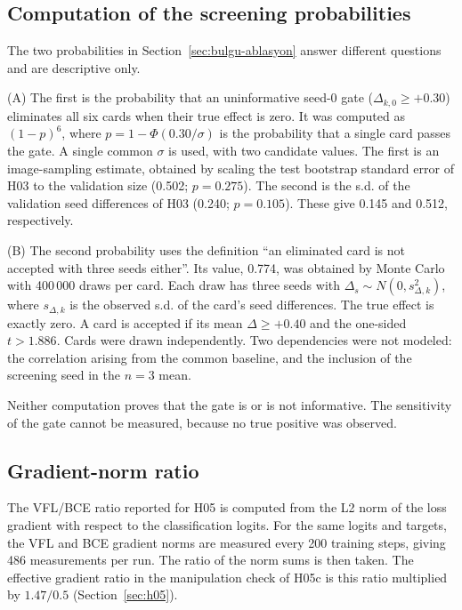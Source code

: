 \subsection{Computation of the screening probabilities}\label{sec:ek-onele}
The two probabilities in Section~\ref{sec:bulgu-ablasyon} answer different questions and are descriptive only.

(A) The first is the probability that an uninformative seed-0 gate ($\Delta_{k,0}\ge+0.30$) eliminates all six cards when their true effect is zero. It was computed as $(1-p)^6$, where $p=1-\Phi(0.30/\sigma)$ is the probability that a single card passes the gate. A single common $\sigma$ is used, with two candidate values. The first is an image-sampling estimate, obtained by scaling the test bootstrap standard error of H03 to the validation size (0.502; $p=0.275$). The second is the s.d. of the validation seed differences of H03 (0.240; $p=0.105$). These give 0.145 and 0.512, respectively.

(B) The second probability uses the definition ``an eliminated card is not accepted with three seeds either''. Its value, 0.774, was obtained by Monte Carlo with 400\,000 draws per card. Each draw has three seeds with $\Delta_s\sim N(0,s_{\Delta,k}^2)$, where $s_{\Delta,k}$ is the observed s.d. of the card's seed differences. The true effect is exactly zero. A card is accepted if its mean $\Delta\ge+0.40$ and the one-sided $t>1.886$. Cards were drawn independently. Two dependencies were not modeled: the correlation arising from the common baseline, and the inclusion of the screening seed in the $n=3$ mean.

Neither computation proves that the gate is or is not informative. The sensitivity of the gate cannot be measured, because no true positive was observed.

\subsection{Gradient-norm ratio}\label{sec:ek-gradyan}
The VFL/BCE ratio reported for H05 is computed from the L2 norm of the loss gradient with respect to the classification logits. For the same logits and targets, the VFL and BCE gradient norms are measured every 200 training steps, giving 486 measurements per run. The ratio of the norm sums is then taken. The effective gradient ratio in the manipulation check of H05c is this ratio multiplied by $1.47/0.5$ (Section~\ref{sec:h05}).

